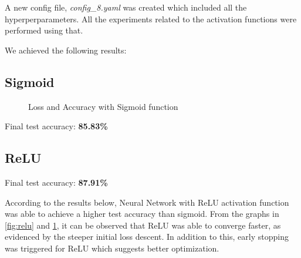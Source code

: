 \documentclass{article}
\begin{document}
A new config file, \textit{config\_8.yaml} was created which included all the hyperperparameters. All the experiments related to the activation functions were performed using that.

We achieved the following results:\\

\subsection{Sigmoid} 
\begin{figure}[h!]
    \centering
    \hfill
    \caption{Loss and Accuracy with Sigmoid function}
    \label{fig:sigmoid}
\end{figure}

Final test accuracy: \textbf{85.83\%}

\subsection{ReLU}

Final test accuracy: \textbf{87.91\%}

According to the results below, Neural Network with ReLU activation function was able to achieve a higher test accuracy than sigmoid. From the graphs in \ref{fig:relu} and \ref{fig:sigmoid}, it can be observed that ReLU was able to converge faster, as evidenced by the steeper initial loss descent. In addition to this, early stopping was triggered for ReLU which suggests better optimization.
\end{document}
